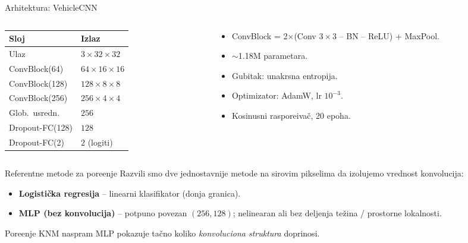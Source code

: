 \documentclass[aspectratio=169]{beamer}
\begin{document}
\begin{frame}{Arhitektura: VehicleCNN}
  \begin{columns}
    \begin{column}{0.5\textwidth}
      \footnotesize
      \begin{tabular}{ll}
        \toprule
        \textbf{Sloj} & \textbf{Izlaz} \\
        \midrule
        Ulaz             & $3\times32\times32$ \\
        ConvBlock(64)    & $64\times16\times16$ \\
        ConvBlock(128)   & $128\times8\times8$ \\
        ConvBlock(256)   & $256\times4\times4$ \\
        Glob.\ usredn.   & $256$ \\
        Dropout-FC(128)  & $128$ \\
        Dropout-FC(2)    & $2$ (logiti) \\
        \bottomrule
      \end{tabular}
    \end{column}
    \begin{column}{0.5\textwidth}
      \begin{itemize}
        \item ConvBlock = 2$\times$(Conv $3\times3$ -- BN -- ReLU) + MaxPool.
        \item $\sim$1.18M parametara.
        \item Gubitak: unakrsna entropija.
        \item Optimizator: AdamW, lr $10^{-3}$.
        \item Kosinusni raspore\dj iva\v c, 20 epoha.
      \end{itemize}
    \end{column}
  \end{columns}
\end{frame}

\begin{frame}{Referentne metode za pore\dj enje}
  Razvili smo dve jednostavnije metode na sirovim pikselima da izolujemo
  vrednost konvolucija:
  \begin{itemize}
    \item \textbf{Logisti\v cka regresija} -- linearni klasifikator (donja
          granica).
    \item \textbf{MLP (bez konvolucija)} -- potpuno povezan $(256,128)$;
          nelinearan ali bez deljenja te\v zina / prostorne lokalnosti.
  \end{itemize}
  \vfill
  Pore\dj enje KNM naspram MLP pokazuje ta\v cno koliko \emph{konvoluciona
  struktura} doprinosi.
\end{frame}
\end{document}
